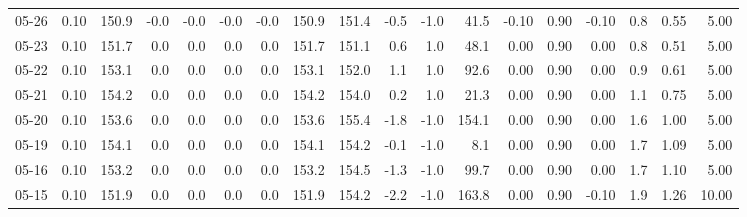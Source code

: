 \begin{threeparttable}
{\begin{tabular}{lrrrrrrrrrrrrrrrrr}
  05-26 &     0.10 & 150.9 &              -0.0 &              -0.0 &               -0.0 &               -0.0 & 150.9 & 151.4 &       -0.5 &                     -1.0 &                41.5 &      -0.10 &      0.90 &          -0.10 &              0.8 &            0.55 &                   5.00 \\
  05-23 &     0.10 & 151.7 &               0.0 &               0.0 &                0.0 &                0.0 & 151.7 & 151.1 &        0.6 &                      1.0 &                48.1 &       0.00 &      0.90 &           0.00 &              0.8 &            0.51 &                   5.00 \\
  05-22 &     0.10 & 153.1 &               0.0 &               0.0 &                0.0 &                0.0 & 153.1 & 152.0 &        1.1 &                      1.0 &                92.6 &       0.00 &      0.90 &           0.00 &              0.9 &            0.61 &                   5.00 \\
  05-21 &     0.10 & 154.2 &               0.0 &               0.0 &                0.0 &                0.0 & 154.2 & 154.0 &        0.2 &                      1.0 &                21.3 &       0.00 &      0.90 &           0.00 &              1.1 &            0.75 &                   5.00 \\
  05-20 &     0.10 & 153.6 &               0.0 &               0.0 &                0.0 &                0.0 & 153.6 & 155.4 &       -1.8 &                     -1.0 &               154.1 &       0.00 &      0.90 &           0.00 &              1.6 &            1.00 &                   5.00 \\
  05-19 &     0.10 & 154.1 &               0.0 &               0.0 &                0.0 &                0.0 & 154.1 & 154.2 &       -0.1 &                     -1.0 &                 8.1 &       0.00 &      0.90 &           0.00 &              1.7 &            1.09 &                   5.00 \\
  05-16 &     0.10 & 153.2 &               0.0 &               0.0 &                0.0 &                0.0 & 153.2 & 154.5 &       -1.3 &                     -1.0 &                99.7 &       0.00 &      0.90 &           0.00 &              1.7 &            1.10 &                   5.00 \\
  05-15 &     0.10 & 151.9 &               0.0 &               0.0 &                0.0 &                0.0 & 151.9 & 154.2 &       -2.2 &                     -1.0 &               163.8 &       0.00 &      0.90 &          -0.10 &              1.9 &            1.26 &                  10.00 \\

\end{tabular}}
\end{threeparttable}
